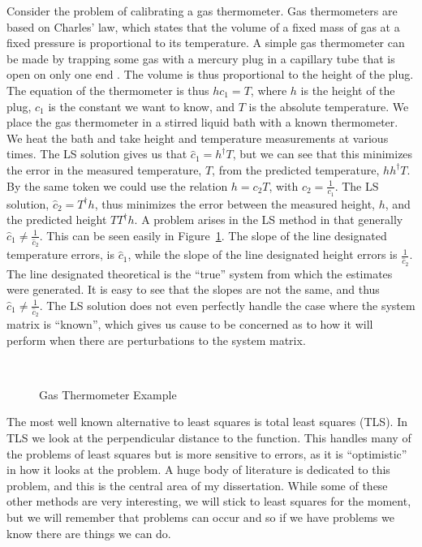 Consider the problem of calibrating a gas thermometer.  Gas 
thermometers are based on Charles' law, which states that the volume 
of a fixed mass of gas at a fixed pressure is proportional to its 
temperature.  A simple gas thermometer can be made by trapping some 
gas with a mercury plug in a capillary tube that is open on only one 
end .  The volume is thus proportional to the height of the 
plug.  The equation of the thermometer is thus $hc_{1}=T$, where $h$ is the 
height of the plug, $c_{1}$ is the constant we want to know, and $T$ is the 
absolute temperature.  We place the gas thermometer in a stirred liquid bath 
with a known thermometer.  We heat the bath and take height and temperature 
measurements at various times.  The LS solution gives us 
that $\hat c_{1}=h^{\dagger}T$, but we can see that this minimizes the 
error in the measured temperature, $T$, from the predicted temperature, 
$hh^{\dagger}T$.  By the same token we could use the relation $h=c_{2}T$, 
with $c_{2}=\frac{1}{c_{1}}$.  The LS solution, $\hat c_{2}=T^{\dagger}h$, 
thus minimizes the error between the measured height, $h$, and the predicted 
height $TT^{\dagger}h$.  A problem arises in the LS 
method in that generally $\hat c_{1}\ne\frac{1}{\hat c_{2}}$.  This 
can be seen easily in Figure~\ref{gastherm}.  The slope of the line designated 
temperature errors, is $\hat c_{1}$, while the slope of the line 
designated height errors is $\frac{1}{\hat c_{2}}$.  The line 
designated theoretical is the ``true'' system from which the estimates 
were generated.  It is easy to see that the slopes are not the same, 
and thus $\hat c_{1}\ne\frac{1}{\hat c_{2}}$.  The LS solution does 
not even perfectly handle the case where the system matrix is 
``known'', which gives us cause to be concerned as to how it will 
perform when there are perturbations to the system matrix.

\begin{figure}[h]
\begin{center}
\leavevmode
\hbox{
\epsfxsize=4in
}
\end{center}
\caption{Gas Thermometer Example}
\label{gastherm}
\end{figure}

The most well known alternative to least squares is total least 
squares (TLS).  In TLS we look at the perpendicular distance to the 
function.  This handles many of the problems of least squares but is 
more sensitive to errors, as it is ``optimistic'' in how it looks at 
the problem.  A huge body of literature is dedicated to this problem, 
and this is the central area of my dissertation.  While some of these 
other methods are very interesting, we will stick to least squares 
for the moment, but we will remember that problems can occur and so 
if we have problems we know there are things we can do.

